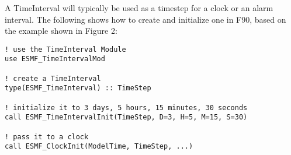 
A TimeInterval will typically be used as a timestep for a clock or an alarm
interval.  The following shows how to create and initialize one in F90, based
on the example shown in Figure 2:

\begin{verbatim}
! use the TimeInterval Module
use ESMF_TimeIntervalMod

! create a TimeInterval
type(ESMF_TimeInterval) :: TimeStep

! initialize it to 3 days, 5 hours, 15 minutes, 30 seconds
call ESMF_TimeIntervalInit(TimeStep, D=3, H=5, M=15, S=30)

! pass it to a clock
call ESMF_ClockInit(ModelTime, TimeStep, ...)
\end{verbatim}
